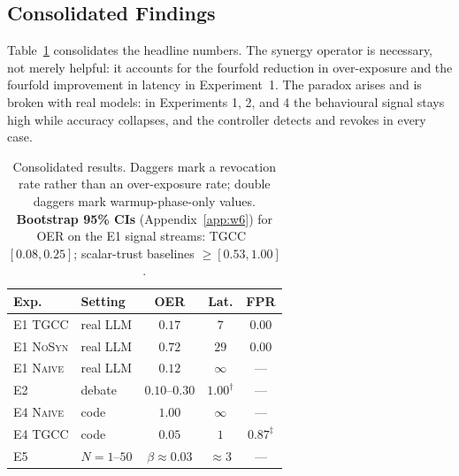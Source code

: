 \documentclass[sigconf,anonymous]{acmart}
\theoremstyle{plain}
\theoremstyle{definition}
\theoremstyle{remark}
\begin{document}
\subsection{Consolidated Findings}
Table~\ref{tab:consolidated} consolidates the headline numbers. The synergy operator is
necessary, not merely helpful: it accounts for the fourfold reduction in over-exposure and
the fourfold improvement in latency in Experiment~1. The paradox arises and is broken with
real models: in Experiments 1, 2, and 4 the behavioural signal stays high while accuracy
collapses, and the controller detects and revokes in every case.

\begin{table}[t]
\caption{Consolidated results. Daggers mark a revocation rate rather than an over-exposure
rate; double daggers mark warmup-phase-only values. \textbf{Bootstrap 95\% CIs}
(Appendix~\ref{app:w6}) for OER on the E1 signal streams: \textsc{TGCC}~$[0.08,0.25]$;
scalar-trust baselines $\ge[0.53,1.00]$.}
\label{tab:consolidated}
\centering\footnotesize\renewcommand{\arraystretch}{1.22}
\begin{tabular}{p{1.25cm} p{1.7cm} c c c}
\toprule
\rowcolor{headrow}
{\color{white}\textbf{Exp.}} & {\color{white}\textbf{Setting}} &
{\color{white}\textbf{OER}} & {\color{white}\textbf{Lat.}} &
{\color{white}\textbf{FPR}} \\
\midrule
\rowcolor{oursrow} E1 \textsc{TGCC} & real LLM & $0.17$ & $7$ & $0.00$ \\
E1 \textsc{NoSyn} & real LLM & $0.72$ & $29$ & $0.00$ \\
E1 \textsc{Naive} & real LLM & $0.12$ & $\infty$ & — \\
\midrule
\rowcolor{oursrow} E2 & debate & $0.10$--$0.30$ & $1.00^{\dagger}$ & — \\
\midrule
E4 \textsc{Naive} & code & $1.00$ & $\infty$ & — \\
\rowcolor{oursrow} E4 \textsc{TGCC} & code & $0.05$ & $1$ & $0.87^{\ddagger}$ \\
\midrule
\rowcolor{oursrow} E5 & $N{=}1$--$50$ & $\beta\!\approx\!0.03$ & $\approx3$ & — \\
\bottomrule
\end{tabular}
\end{table}
\end{document}

